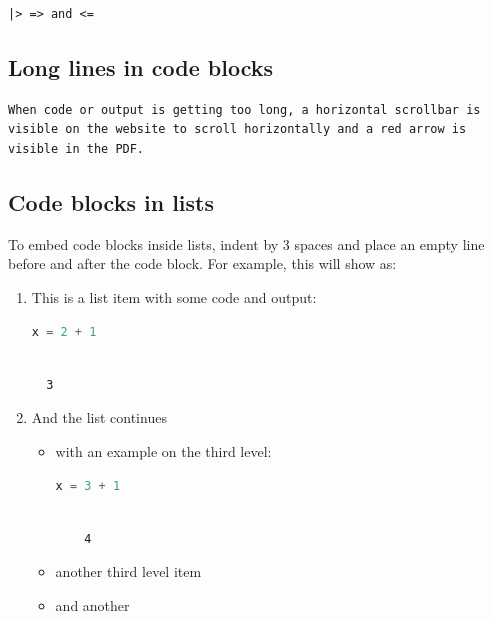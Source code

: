 \documentclass[
  notoc %
]{tufte-book}
\begin{document}
\begin{lstlisting}
|> => and <=
\end{lstlisting}

\hypertarget{long-lines-in-code-blocks}{%
\subsection{Long lines in code blocks}\label{long-lines-in-code-blocks}}

\begin{lstlisting}
When code or output is getting too long, a horizontal scrollbar is visible on the website to scroll horizontally and a red arrow is visible in the PDF.
\end{lstlisting}

\hypertarget{code-blocks-in-lists}{%
\subsection{Code blocks in lists}\label{code-blocks-in-lists}}

To embed code blocks inside lists, indent by 3 spaces and place an empty
line before and after the code block. For example, this will show as:

\begin{enumerate}
\def\labelenumi{\arabic{enumi}.}
\item
  This is a list item with some code and output:

  \begin{lstlisting}[language=Julia]
  x = 2 + 1
  \end{lstlisting}

  \begin{lstlisting}[language=Output]

  3

  \end{lstlisting}
\item
  And the list continues

  \begin{itemize}
  \item
    with an example on the third level:

    \begin{lstlisting}[language=Julia]
    x = 3 + 1
    \end{lstlisting}

    \begin{lstlisting}[language=Output]

    4

    \end{lstlisting}
  \item
    another third level item
  \item
    and another
  \end{itemize}
\end{enumerate}
\end{document}
